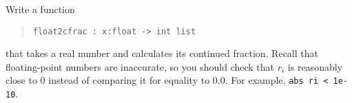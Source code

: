 Write a function
\begin{quote}
  \lstinline{float2cfrac : x:float -> int list}
\end{quote}
that takes a real number and calculates its continued fraction. Recall that floating-point numbers are inaccurate, so you should check that $r_i$ is reasonably close to 0 instead of comparing it for equality to 0.0. For example, \lstinline{abs ri < 1e-10}.
